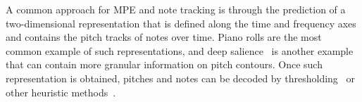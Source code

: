 A common approach for MPE and note tracking is through the prediction of a two-dimensional representation that is defined along the time and frequency axes and contains the pitch tracks of notes over time.
Piano rolls %
are the most common example of such representations, and deep salience~\cite{bittner2017deepsalience} %
is another example that can contain more granular information on pitch contours.
Once such representation is obtained, pitches and notes can be decoded by thresholding~\cite{kelz2016framewise} or other heuristic methods~\cite{kim2018crepe,hawthorne2018onsetsframes}.


